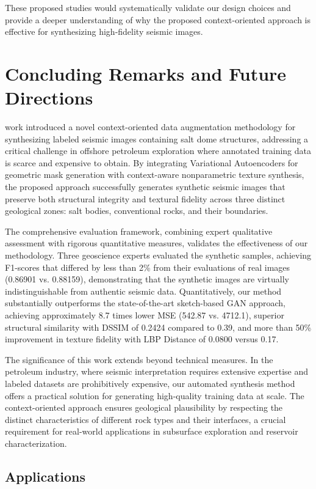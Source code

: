 \documentclass{ieeeaccess}
\begin{document}
These proposed studies would systematically validate our design choices and provide a deeper understanding of why the proposed context-oriented approach is effective for synthesizing high-fidelity seismic images.
\section{Concluding Remarks and Future Directions}
\label{sec:conclusion}

 work introduced a novel context-oriented data augmentation methodology for synthesizing labeled seismic images containing salt dome structures, addressing a critical challenge in offshore petroleum exploration where annotated training data is scarce and expensive to obtain. By integrating Variational Autoencoders for geometric mask generation with context-aware nonparametric texture synthesis, the proposed approach successfully generates synthetic seismic images that preserve both structural integrity and textural fidelity across three distinct geological zones: salt bodies, conventional rocks, and their boundaries.

The comprehensive evaluation framework, combining expert qualitative assessment with rigorous quantitative measures, validates the effectiveness of our methodology. Three geoscience experts evaluated the synthetic samples, achieving F1-scores that differed by less than 2\% from their evaluations of real images (0.86901 vs. 0.88159), demonstrating that the synthetic images are virtually indistinguishable from authentic seismic data. Quantitatively, our method substantially outperforms the state-of-the-art sketch-based GAN approach, achieving approximately 8.7 times lower MSE (542.87 vs. 4712.1), superior structural similarity with DSSIM of 0.2424 compared to 0.39, and more than 50\% improvement in texture fidelity with LBP Distance of 0.0800 versus 0.17.

The significance of this work extends beyond technical measures. In the petroleum industry, where seismic interpretation requires extensive expertise and labeled datasets are prohibitively expensive, our automated synthesis method offers a practical solution for generating high-quality training data at scale. The context-oriented approach ensures geological plausibility by respecting the distinct characteristics of different rock types and their interfaces, a crucial requirement for real-world applications in subsurface exploration and reservoir characterization.

\subsection{Applications}
\end{document}
